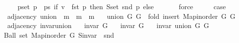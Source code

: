 \begin{isabellebody}
\ \ \ \ \ {\isacharparenleft}{\kern0pt}{\isasymUnion}p{\isasymin}set\ {\isacharparenleft}{\kern0pt}p\ {\isacharhash}{\kern0pt}\ ps{\isacharparenright}{\kern0pt}{\isachardot}{\kern0pt}\ if\ v\ {\isacharequal}{\kern0pt}\ fst\ p\ then\ S{\isachardot}{\kern0pt}set\ {\isacharparenleft}{\kern0pt}snd\ p{\isacharparenright}{\kern0pt}\ else\ {\isacharbraceleft}{\kern0pt}{\isacharbraceright}{\kern0pt}{\isacharparenright}{\kern0pt}{\isachardoublequoteclose}\isanewline
\ \ \ \ \isamarkupfalse%
\ force\isanewline
\ \ \isamarkupfalse%
\ \isamarkupfalse%
\ {\isacharquery}{\kern0pt}case\isanewline
\ \ \ \ \isacommand{{\isachardot}{\kern0pt}}\isamarkupfalse%
\isanewline
{}\isamarkupfalse%
%
\endisatagproof
{\isafoldproof}%
%
\isadelimproof
\isanewline
%
\endisadelimproof
\isanewline
{}\isamarkupfalse%
\ {\isacharparenleft}{\kern0pt}\ adjacency{\isacharparenright}{\kern0pt}\ union\ {\isacharcolon}{\kern0pt}{\isacharcolon}{\kern0pt}\ {\isachardoublequoteopen}{\isacharprime}{\kern0pt}m\ {\isasymRightarrow}\ {\isacharprime}{\kern0pt}m\ {\isasymRightarrow}\ {\isacharprime}{\kern0pt}m{\isachardoublequoteclose}\ \isanewline
\ \ {\isachardoublequoteopen}union\ G{}\ G{}\ {\isasymequiv}\ fold\ insert{\isacharunderscore}{\kern0pt}{}\ {\isacharparenleft}{\kern0pt}Map{\isacharunderscore}{\kern0pt}inorder\ G{}{\isacharparenright}{\kern0pt}\ G{}{\isachardoublequoteclose}\isanewline
\isanewline
{}\isamarkupfalse%
\ {\isacharparenleft}{\kern0pt}\ adjacency{\isacharparenright}{\kern0pt}\ invar{\isacharunderscore}{\kern0pt}union{\isacharcolon}{\kern0pt}\isanewline
\ \ \ {\isachardoublequoteopen}invar\ G{}{\isachardoublequoteclose}\isanewline
\ \ \ {\isachardoublequoteopen}invar\ G{}{\isachardoublequoteclose}\isanewline
\ \ \ {\isachardoublequoteopen}invar\ {\isacharparenleft}{\kern0pt}union\ G{}\ G{}{\isacharparenright}{\kern0pt}{\isachardoublequoteclose}\isanewline
%
\isadelimproof
%
\endisadelimproof
%
\isatagproof
{}\isamarkupfalse%
\ {\isacharminus}{\kern0pt}\isanewline
\ \ \isamarkupfalse%
\ {\isachardoublequoteopen}Ball\ {\isacharparenleft}{\kern0pt}set\ {\isacharparenleft}{\kern0pt}Map{\isacharunderscore}{\kern0pt}inorder\ G{}{\isacharparenright}{\kern0pt}{\isacharparenright}{\kern0pt}\ {\isacharparenleft}{\kern0pt}S{\isachardot}{\kern0pt}invar\ {\isasymcirc}\ snd{\isacharparenright}{\kern0pt}{\isachardoublequoteclose}\isanewline

\end{isabellebody}
